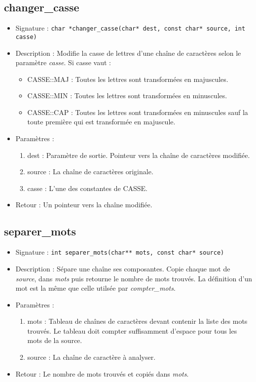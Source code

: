 \documentclass[12pt,pdftex,oneside]{article}
\begin{document}
\subsection{changer\_casse}
\begin{itemize}
\item Signature : \texttt{char *changer\_casse(char* dest, const char* source, int casse)}
\item Description : Modifie la casse de lettres d'une chaîne de caractères selon le paramètre \emph{casse}.
  Si casse vaut :
  \begin{itemize}
  \item CASSE::MAJ : Toutes les lettres sont transformées en majuscules.
  \item CASSE::MIN : Toutes les lettres sont transformées en minuscules.
  \item CASSE::CAP : Toutes les lettres sont transformées en minuscules sauf la toute première qui est transformée en majuscule.
  \end{itemize}

\item Paramètres :
  \begin{enumerate}
  \item dest : Paramètre de sortie. Pointeur vers la chaîne de caractères modifiée.
  \item source : La chaîne de caractères originale.
  \item casse : L'une des constantes de CASSE.
  \end{enumerate}

\item Retour : Un pointeur vers la chaîne modifiée.
\end{itemize}

\subsection{separer\_mots}
\begin{itemize}
\item Signature : \texttt{int separer\_mots(char** mots, const char* source)}
\item Description : Sépare une chaîne ses composantes. Copie chaque mot de \emph{source}, dans \emph{mots} puis retourne le nombre de mots trouvés. La définition d'un mot est la même que celle utilsée par \emph{compter\_mots}.
\item Paramètres :
  \begin{enumerate}
  \item mots : Tableau de chaînes de caractères devant contenir la liste des mots trouvés. Le tableau doit compter suffisamment d'espace pour tous les mots de la source.
    \item source : La chaîne de caractère à analyser.
    \end{enumerate}
  \item Retour : Le nombre de mots trouvés et copiés dans \emph{mots}.
  \end{itemize}
\end{document}
